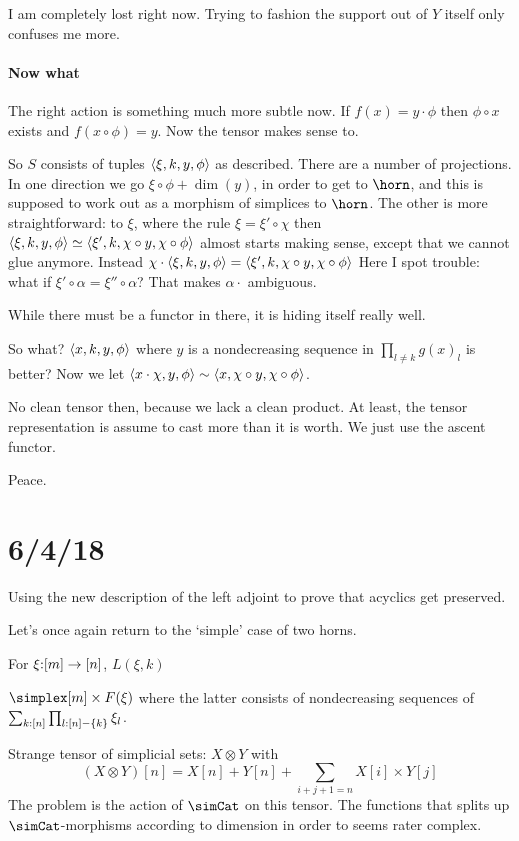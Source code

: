 \documentclass[csh.tex]{subfiles}
\begin{document}
I am completely lost right now. Trying to fashion the support out of $Y$ itself only confuses me more.

\paragraph{Now what}
The right action is something much more subtle now.
If $f(x) = y\cdot \phi$ then $\phi\circ x$ exists and $f(x\circ \phi) = y$. Now the tensor makes sense to.

So $S$ consists of tuples $\left\langle \xi,k,y,\phi \right\rangle$ as described. There are a number of projections. In one direction we go $\xi\circ \phi + \dim(y)$, in order to get to $\horn$, and this is supposed to work out as a morphism of simplices to $\horn$. The other is more straightforward: to $\xi$, where the rule $\xi = \xi'\circ \chi$ then $\left\langle \xi,k,y,\phi \right\rangle\simeq \left\langle \xi',k,\chi\circ y,\chi\circ \phi \right\rangle$ almost starts making sense, except that we cannot glue anymore. Instead
$\chi\cdot\left\langle \xi,k,y,\phi \right\rangle = \left\langle \xi',k,\chi\circ y,\chi\circ \phi \right\rangle$
Here I spot trouble: what if $\xi'\circ\alpha = \xi''\circ \alpha$?
That makes $\alpha\cdot$ ambiguous.

While there must be a functor in there, it is hiding itself really well.

So what? $\left\langle x,k,y,\phi \right\rangle$ where $y$ is a nondecreasing sequence in $\prod_{l\neq k} g(x)_l$ is better? Now we let $\left\langle x\cdot \chi,y,\phi \right\rangle\sim\left\langle x,\chi\circ y,\chi\circ \phi \right\rangle$.

No clean tensor then, because we lack a clean product. At least, the tensor representation is assume to cast more than it is worth. We just use the ascent functor.

Peace.


\section{6/4/18}
Using the new description of the left adjoint to prove that acyclics get preserved.

Let's once again return to the `simple' case of two horns.

For $\xi\mathord : [m]\to[n]$, $L(\xi,k)$

$\simplex[m]\times F(\xi)$ where the latter consists of nondecreasing sequences of $\sum_{k\mathord :[n]}\prod_{l\mathord : [n]-\left\{k\right\}} \xi_l$.


Strange tensor of simplicial sets:
$X\otimes Y$ with \[(X\otimes Y)[n] = X[n]+Y[n]+\sum_{i+j+1=n} X[i]\times Y[j]\]
The problem is the action of $\simCat$ on this tensor. The functions that splits up $\simCat$-morphisms according to dimension in order to 
seems rater complex.
\end{document}
